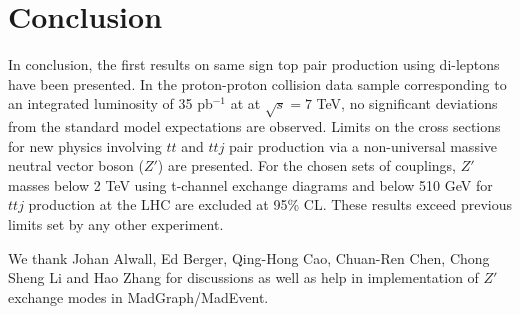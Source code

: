 \section{Conclusion}
\label{sec:conclusion}
In conclusion, the first results on same sign top pair production using di-leptons have been presented. 
In the proton-proton collision data sample corresponding to an integrated luminosity of 35 pb$^{-1}$ at at $\sqrt{s} = 7 $ TeV, 
no significant deviations from the standard model expectations are observed. 
Limits on the cross sections for new physics involving $tt$ and $ttj$  pair production via a non-universal massive neutral vector boson ($Z'$) are presented. 
For the chosen sets of couplings, $Z'$ masses below 2 TeV using t-channel exchange diagrams and below 510 GeV 
for $ttj$ production at the LHC are excluded at 95\% CL. 
These results exceed previous limits set by any other experiment.

\ack

We thank Johan Alwall, Ed Berger, Qing-Hong Cao, Chuan-Ren Chen, Chong Sheng Li and Hao Zhang for 
discussions as well as help in implementation of $Z'$ exchange modes in MadGraph/MadEvent. 


